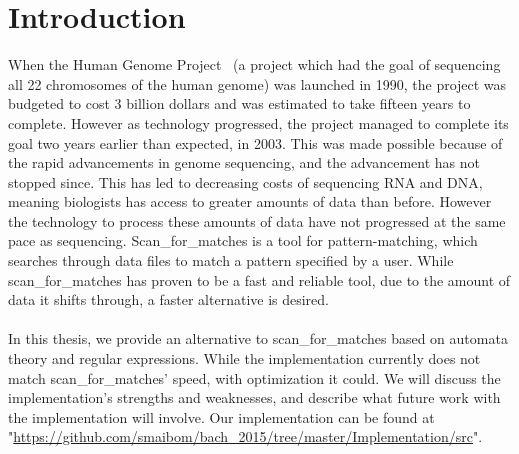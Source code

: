 \section{Introduction}%
When the Human Genome Project~\cite{hgp} (a project which had the goal of sequencing 
all 22 chromosomes of the human genome) was launched in 1990, the project was 
budgeted to cost 3 billion dollars and was estimated to take fifteen years 
to complete. However as technology progressed, the project managed to complete 
its goal two years earlier than expected, in 2003. This was made possible 
because of the rapid advancements in genome sequencing, and the advancement 
has not stopped since. This has led to decreasing costs of sequencing RNA and DNA, 
meaning biologists has access to greater amounts of data than before. 
However the technology to process these amounts of data have not progressed at 
the same pace as sequencing. Scan\_for\_matches is a tool for pattern-matching, 
which searches through data files to match a pattern specified by a user. 
While scan\_for\_matches has proven to be a fast and reliable 
tool, due to the amount of data it shifts through, a faster alternative 
is desired.\\\\
In this thesis, we provide an alternative to scan\_for\_matches based on 
automata theory and regular expressions. While the implementation currently 
does not match scan\_for\_matches' speed, with optimization it could. We will 
discuss the implementation's strengths and weaknesses, and describe what 
future work with the implementation will involve.
Our implementation can be found at 
"\url{https://github.com/smaibom/bach_2015/tree/master/Implementation/src}".
\begin{comment}
After hearing about this problem, we thought that there must be a better 
way of searching through data that is also theoretically sound. Our first 
thought was using automata-based searching methods, since this provides a 
calculable best- and worst-case run time while being theoretically sound. 
Since regular expressions uses an automata-based way of searching, we hypothesized 
that implementing regular expressions which have the same functions as 
scan\_for\_matches would lead to faster run times.
\end{comment}
